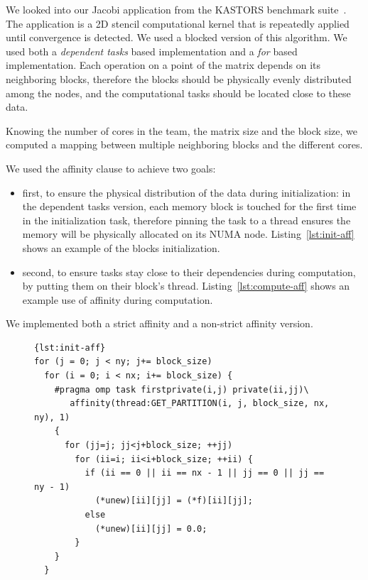 \documentclass{Styles/llncs}
\begin{document}
We looked into our Jacobi application from the KASTORS benchmark suite~\cite{virouleau:hal-01081974}.
The application is a 2D stencil computational kernel that is repeatedly applied until
convergence is detected. We used a blocked version of this algorithm.
We used both a \emph{dependent tasks} based implementation and a \emph{for} based implementation.
Each operation on a point of the matrix depends on its neighboring blocks,
therefore the blocks should be physically evenly distributed among the nodes,
and the computational tasks should be located close to these data.

Knowing the number of cores in the team, the matrix size and the block size, we computed a mapping
between multiple neighboring blocks and the different cores.

We used the affinity clause to achieve two goals:
\begin{itemize}
    \item first, to ensure the physical distribution of the data during initialization:
      in the dependent tasks version, each memory block is touched for the first time
      in the initialization task, therefore pinning the task to a thread ensures
      the memory will be physically allocated on its NUMA node.
      Listing~\ref{lst:init-aff} shows an example of the blocks initialization.
    \item second, to ensure tasks stay close to their dependencies during computation, by putting them on their block's thread.
      Listing~\ref{lst:compute-aff} shows an example use of affinity during computation.
\end{itemize}


We implemented both a strict affinity and a non-strict affinity version.


\begin{figure}[htbp]
\begin{lstlisting}[caption=Example of use of the affinity clause for initialization,frame=tlrb,style=smaller,label=lst:init-aff]{lst:init-aff}
for (j = 0; j < ny; j+= block_size)
  for (i = 0; i < nx; i+= block_size) {
    #pragma omp task firstprivate(i,j) private(ii,jj)\
       affinity(thread:GET_PARTITION(i, j, block_size, nx, ny), 1)
    {
      for (jj=j; jj<j+block_size; ++jj)
        for (ii=i; ii<i+block_size; ++ii) {
          if (ii == 0 || ii == nx - 1 || jj == 0 || jj == ny - 1)
            (*unew)[ii][jj] = (*f)[ii][jj];
          else
            (*unew)[ii][jj] = 0.0;
        }
    }
  }
\end{lstlisting}
\end{figure}
\end{document}
